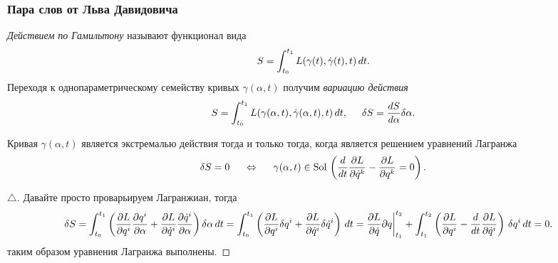 \subsubsection*{Пара слов от Льва Давидовича}


\begin{to_def} 
    \textit{Действием по Гамильтону} называют функционал вида
    \begin{equation*}
         S = \int_{t_0}^{t_1} L(\gamma(t), \dot{\gamma}(t), t) \, d t.
    \end{equation*} 
    Переходя к однопараметрическому семейству кривых $\gamma(\alpha, t)$ получим \textit{вариацию действия}
    \begin{equation*}
        S = \int_{t_0}^{t_1} L(\gamma(\alpha, t), \dot{\gamma}(\alpha, t), t) \, d t, 
        \hspace{0.5cm} 
        \delta S = \frac{d S}{d \alpha} \delta \alpha.
    \end{equation*}
\end{to_def}


\begin{to_thr}
    Кривая $\gamma(\alpha, t)$ является экстремалью действия тогда и только тогда, когда является решением уравнений Лагранжа
     \begin{equation*}
         \delta S = 0
         \hspace{0.5cm} \Leftrightarrow \hspace{0.5cm} 
         \gamma(\alpha, t) \in \textnormal{Sol}\,
         \left(
     \frac{d}{dt} \frac{\partial L}{\partial \dot{q}^k} - \frac{\partial L}{\partial q^k} = 0
         \right)
         .
     \end{equation*}
\end{to_thr}


\begin{proof}[$\triangle$]
    Давайте просто проварьируем Лагранжиан, тогда
    \begin{align*}
        \delta S 
        &=
         \int_{t_0}^{t_1} 
        \left(
            \frac{\partial L}{\partial q^i} \frac{\partial q^i}{\partial \alpha} +
            \frac{\partial L}{\partial \dot{q}^i} \frac{\partial \dot{q}^i}{\partial \alpha}  
        \right) \delta \alpha \, d t 
        =
        \int_{t_0}^{t_1} \left(
            \frac{\partial L}{\partial q^i} \delta q^i + \frac{\partial L}{\partial \dot{q}^i} \delta \dot{q}^i
        \right) \, d t
        =
        \frac{\partial L}{\partial \dot{q}} \partial q \bigg|_{t_1}^{t_2}
        + \int_{t_1}^{t_2}
        \left(
            \frac{\partial L}{\partial q^i} - \frac{d }{d t} \frac{\partial L}{\partial \dot{q}^i} 
        \right) \,\delta q^i \, d t
        = 0.
    \end{align*}
    таким образом уравнения Лагранжа выполнены. 
\end{proof}

